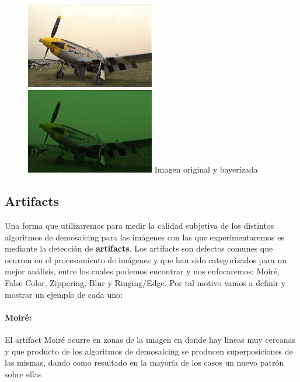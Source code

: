 \begin{figure}[h]
       \includegraphics[width=0.5\textwidth]{imagenes/img9.png}
           \hfill
        \includegraphics[width=0.5\textwidth]{imagenes/img9_bayer.png}   
        Imagen original y bayerizada
\end{figure}
\newpage
\subsection{Artifacts}

Una forma que utilizaremos para medir la calidad subjetiva de los distintos algoritmos de demosaicing para las imágenes con las que experimentaremos es mediante la detección de \textbf{artifacts}. Los artifacts son defectos comunes que ocurren en el procesamiento de imágenes y que han sido categorizados para un mejor análisis, entre los cuales podemos encontrar y nos enfocaremos: Moiré, False Color, Zippering, Blur y Ringing/Edge. Por tal motivo vamos a definir y mostrar un ejemplo de cada uno:

\paragraph{Moiré:}
El artifact Moiré ocurre en zonas de la imagen en donde hay lineas muy cercanas y que producto de los algoritmos de demosaicing se producen superposiciones de las mismas, dando como resultado en la mayoría de los casos un nuevo patrón sobre ellas

